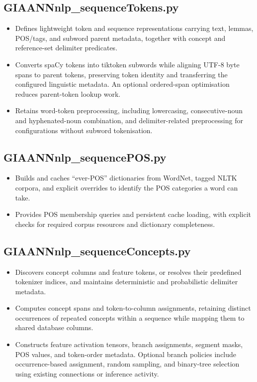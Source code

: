 \subsection{GIAANNnlp\_sequenceTokens.py}
\begin{itemize}
	\item Defines lightweight token and sequence representations carrying text, lemmas, POS/tags, and subword parent metadata, together with concept and reference-set delimiter predicates.
	\item Converts spaCy tokens into tiktoken subwords while aligning UTF-8 byte spans to parent tokens, preserving token identity and transferring the configured linguistic metadata. An optional ordered-span optimisation reduces parent-token lookup work.
	\item Retains word-token preprocessing, including lowercasing, consecutive-noun and hyphenated-noun combination, and delimiter-related preprocessing for configurations without subword tokenisation.
\end{itemize}

\subsection{GIAANNnlp\_sequencePOS.py}
\begin{itemize}
	\item Builds and caches ``ever-POS'' dictionaries from WordNet, tagged NLTK corpora, and explicit overrides to identify the POS categories a word can take.
	\item Provides POS membership queries and persistent cache loading, with explicit checks for required corpus resources and dictionary completeness.
\end{itemize}

\subsection{GIAANNnlp\_sequenceConcepts.py}
\begin{itemize}
	\item Discovers concept columns and feature tokens, or resolves their predefined tokenizer indices, and maintains deterministic and probabilistic delimiter metadata.
	\item Computes concept spans and token-to-column assignments, retaining distinct occurrences of repeated concepts within a sequence while mapping them to shared database columns.
	\item Constructs feature activation tensors, branch assignments, segment masks, POS values, and token-order metadata. Optional branch policies include occurrence-based assignment, random sampling, and binary-tree selection using existing connections or inference activity.
\end{itemize}

